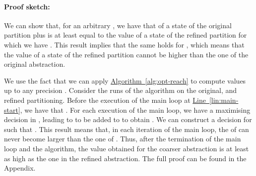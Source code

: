 \documentclass[10pt,twocolumn]{article}
\newenvironment{proofsketch}{\paragraph{Proof sketch:}}{\hfill}
\newcommand{\refalg}[1]{\texorpdfstring{\hyperref[alg:#1]{Algorithm~\ref*{alg:#1}}}{Algorithm~\ref*{alg:#1}}}
\newcommand{\reflin}[1]{\texorpdfstring{\hyperref[lin:#1]{Line~\ref*{lin:#1}}}{Line~\ref*{lin:#1}}}
\begin{document}
\begin{proofsketch}
  We can show that, for an arbitrary , we have that  of a state  
  of the original partition plus  is at least equal to the value of a state  of the 
  refined partition for which we have .
  This result implies that the same holds for , which means that the value of 
  a state of the refined partition cannot be higher than the one of the original abstraction.

  We use the fact that we can apply \refalg{opt-reach} to compute values up to any precision .
  Consider the runs of the algorithm on the original, and refined partitioning.
  Before the execution of the main loop at \reflin{main-start}, we have that 
  . For each execution of the main loop, 
  we have a maximising decision in , leading to  to be 
  added to  to obtain .
  We can construct a decision for  such that .
  This result means that, in each iteration of the main loop, the  of  
  can never become larger than the one of . Thus, after the termination of 
  the main loop and the algorithm, the value obtained for the coarser abstraction is 
  at least as high as the one in the refined abstraction.
\end{proofsketch}
  The full proof can be found in the Appendix.
\end{document}

